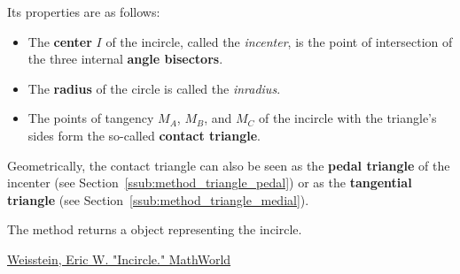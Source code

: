 Its properties are as follows:
\begin{itemize}
  \item The \textbf{center} $I$ of the incircle, called the \emph{incenter}, is the point of intersection of the three internal \textbf{angle bisectors}.
  \item The \textbf{radius} of the circle is called the \emph{inradius}.
  \item The points of tangency $M_A$, $M_B$, and $M_C$ of the incircle with the triangle's sides form the so-called \textbf{contact triangle}.
\end{itemize}


Geometrically, the contact triangle can also be seen as the \textbf{pedal triangle} of the incenter (see Section~\ref{ssub:method_triangle_pedal}) or as the \textbf{tangential triangle} (see Section~\ref{ssub:method_triangle_medial}).

\medskip

The method  returns a  object representing the incircle.
\begin{flushright}
\small
\href{https://mathworld.wolfram.com/Incircle.html}{Weisstein, Eric W. "Incircle." MathWorld}
\end{flushright}

\vspace{1em}

\begin{center}
\end{center}

